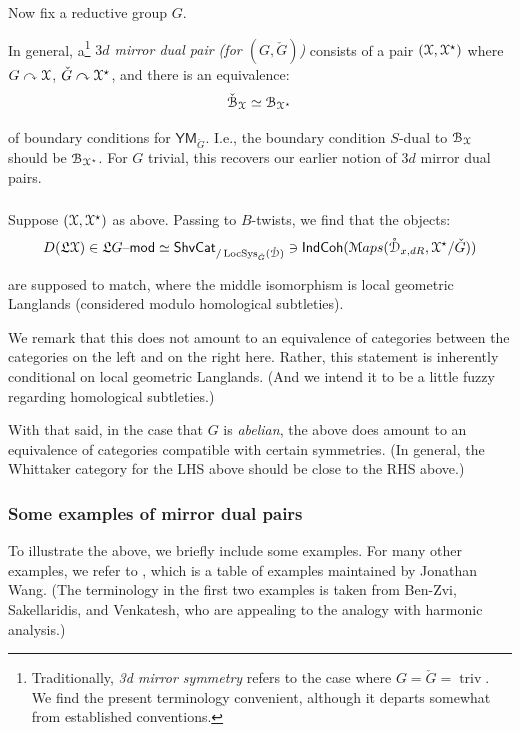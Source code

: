 \documentclass[reqno,11pt]{amsart}
\numberwithin{equation}{subsection}
\theoremstyle{remark}
\newcommand{\sB}{{\EuScript B}}
\newcommand{\sD}{{\EuScript D}}
\newcommand{\sM}{{\EuScript M}}
\newcommand{\sX}{{\EuScript X}}
\newcommand{\fL}{{\mathfrak L}}
\newcommand{\on}{\operatorname}
\newcommand{\mathendash}{\text{\textendash}}
\newcommand{\actson}{\curvearrowright}
\newcommand{\LocSys}{\on{LocSys}}
\renewcommand{\mod}{\mathendash\mathsf{mod}}
\newcommand{\ShvCat}{\mathsf{ShvCat}}
\newcommand{\IndCoh}{\mathsf{IndCoh}}
\newcommand{\Maps}{\sM aps}
\renewcommand{\o}[1]{\mathring{#1}}
\newcommand{\YM}{\mathsf{YM}}
\begin{document}
Now fix a reductive group $G$.

In general, a\footnote{Traditionally, \emph{3d mirror symmetry} refers to
the case where $G = \check{G} = \on{triv}$. We find the present terminology
convenient, although it departs somewhat from established conventions.}
\emph{$3d$ mirror dual pair (for $(G,\check{G})$)}
consists of a pair $(\sX,\sX^{\star})$ where $G \actson \sX$,
$\check{G} \actson \sX^{\star}$, and there is an equivalence:
%
\[
\check{\sB}_{\sX} \simeq \sB_{\sX^{\star}}
\]

\noindent of boundary conditions for $\YM_{\check{G}}$. I.e., the 
boundary condition $S$-dual to $\sB_{\sX}$ should be $\sB_{\sX^{\star}}$.
For $G$ trivial, this recovers our earlier notion of $3d$ mirror dual pairs.

\subsubsection{}

Suppose $(\sX,\sX^{\star})$ as above. Passing to $B$-twists, we find that the objects:
%
\[
D(\fL\sX) \in \fL G\mod \simeq 
\ShvCat_{/\LocSys_{\check{G}}(\o{\sD})} 
\ni 
\IndCoh(\Maps(\o{\sD}_{x,dR},\sX^{\star}/\check{G}))
\]

\noindent are supposed to match, where the middle isomorphism is local geometric
Langlands (considered modulo homological subtleties). 

We remark that this does not amount to an equivalence of categories
between the categories on the left and on the right here. Rather, this
statement is inherently conditional on local geometric Langlands. 
(And we intend it to be a little fuzzy regarding homological subtleties.) 

With that said, in the case that $G$ is \emph{abelian}, the above does
amount to an equivalence of categories compatible with certain symmetries. 
(In general, the Whittaker category for the LHS above should be close to the
RHS above.)

\subsubsection{Some examples of mirror dual pairs}

To illustrate the above, we briefly include some examples.
For many other examples, we refer to \cite{wang-table}, which is 
a table of examples maintained by Jonathan Wang. (The terminology in the
first two examples is taken from Ben-Zvi, Sakellaridis, and Venkatesh, 
who are appealing to the analogy with harmonic analysis.) 
\end{document}
